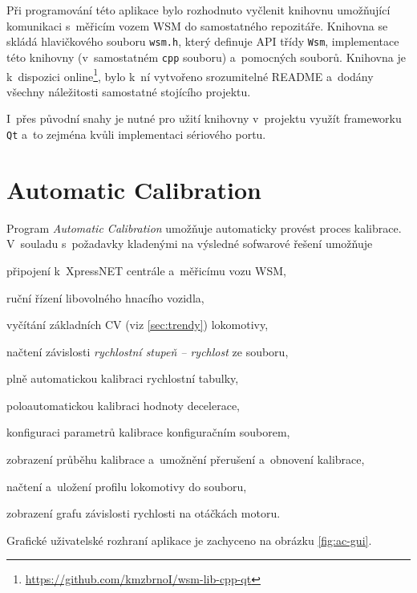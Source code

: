 Při programování této aplikace bylo rozhodnuto vyčlenit knihovnu umožňující
komunikaci s~měřicím vozem WSM do samostatného repozitáře. Knihovna se skládá
hlavičkového souboru \texttt{wsm.h}, který definuje API třídy \texttt{Wsm},
implementace této knihovny (v~samostatném \texttt{cpp} souboru) a~pomocných
souborů. Knihovna je k~dispozici
online\footnote{\url{https://github.com/kmzbrnoI/wsm-lib-cpp-qt}}, bylo k~ní
vytvořeno srozumitelné README a~dodány všechny náležitosti samostatné stojícího
projektu.

I~přes původní snahy je nutné pro užití knihovny v~projektu využít frameworku
\texttt{Qt} a~to zejména kvůli implementaci sériového portu.


\newpage
\section{Automatic Calibration}
\label{sec:sw-wsm-auto-calib}

Program \textit{Automatic Calibration} umožňuje automaticky provést proces
kalibrace. V~souladu s~požadavky kladenými na výsledné sofwarové řešení
umožňuje

\begin{compactitem}
\item připojení k~XpressNET centrále a~měřicímu vozu WSM,
\item ruční řízení libovolného hnacího vozidla,
\item vyčítání základních CV (viz \ref{sec:trendy}) lokomotivy,
\item načtení závislosti \textit{rychlostní stupeň -- rychlost} ze souboru,
\item plně automatickou kalibraci rychlostní tabulky,
\item poloautomatickou kalibraci hodnoty decelerace,
\item konfiguraci parametrů kalibrace konfiguračním souborem,
\item zobrazení průběhu kalibrace a~umožnění přerušení a~obnovení kalibrace,
\item načtení a~uložení profilu lokomotivy do souboru,
\item zobrazení grafu závislosti rychlosti na otáčkách motoru.
\end{compactitem}

Grafické uživatelské rozhraní aplikace je zachyceno na obrázku \ref{fig:ac-gui}.

